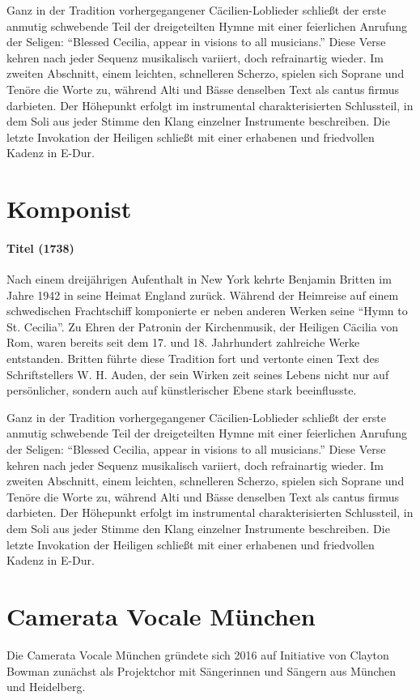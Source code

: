 \documentclass[11pt, ngermanm, titlepage]{article}
\begin{document}
\begin{multicols}{2}
	Ganz in der Tradition vorhergegangener Cäcilien-Loblieder schließt der erste anmutig schwebende Teil der dreigeteilten Hymne mit einer feierlichen Anrufung der Seligen: "`Blessed Cecilia, appear in visions to all musicians."' Diese Verse kehren nach jeder Sequenz musikalisch variiert, doch refrainartig wieder. Im zweiten Abschnitt, einem leichten, schnelleren Scherzo, spielen sich Soprane und Tenöre die Worte zu, während Alti und Bässe denselben Text als cantus firmus darbieten. Der Höhepunkt erfolgt im instrumental charakterisierten Schlussteil, in dem Soli aus jeder Stimme den Klang einzelner Instrumente beschreiben. Die letzte Invokation der Heiligen schließt mit einer erhabenen und friedvollen Kadenz in E-Dur. 
	
	\section*{Komponist}
	\paragraph{Titel (1738)\newline}
	Nach einem dreijährigen Aufenthalt in New York kehrte Benjamin Britten im Jahre 1942 in seine Heimat England zurück. Während der Heimreise auf einem schwedischen Frachtschiff komponierte er neben anderen Werken seine "`Hymn to St. Cecilia"'. Zu Ehren der Patronin der Kirchenmusik, der Heiligen Cäcilia von Rom, waren bereits seit dem 17. und 18. Jahrhundert zahlreiche Werke entstanden. Britten führte diese Tradition fort und vertonte einen Text des Schriftstellers W. H. Auden, der sein Wirken zeit seines Lebens nicht nur auf persönlicher, sondern auch auf künstlerischer Ebene stark beeinflusste. 
	
	Ganz in der Tradition vorhergegangener Cäcilien-Loblieder schließt der erste anmutig schwebende Teil der dreigeteilten Hymne mit einer feierlichen Anrufung der Seligen: "`Blessed Cecilia, appear in visions to all musicians."' Diese Verse kehren nach jeder Sequenz musikalisch variiert, doch refrainartig wieder. Im zweiten Abschnitt, einem leichten, schnelleren Scherzo, spielen sich Soprane und Tenöre die Worte zu, während Alti und Bässe denselben Text als cantus firmus darbieten. Der Höhepunkt erfolgt im instrumental charakterisierten Schlussteil, in dem Soli aus jeder Stimme den Klang einzelner Instrumente beschreiben. Die letzte Invokation der Heiligen schließt mit einer erhabenen und friedvollen Kadenz in E-Dur.
	
	\section*{Camerata Vocale München}
	Die Camerata Vocale München gründete sich 2016 auf Initiative von Clayton Bowman zunächst als Projektchor mit Sängerinnen und Sängern aus München und Heidelberg.
	

\end{multicols}
\end{document}
